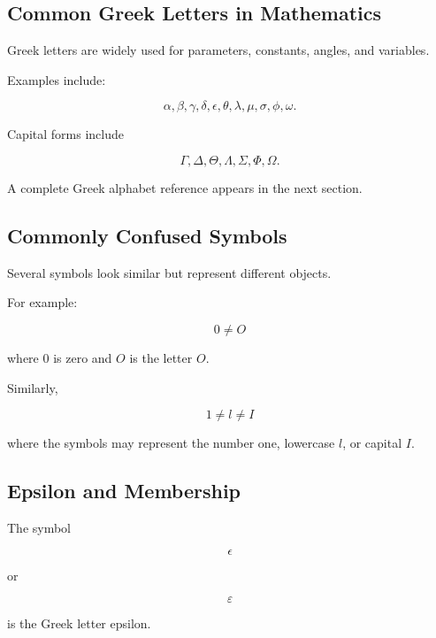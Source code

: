 \subsection{Common Greek Letters in Mathematics}
\label{subsec:greek-symbol-preview}

Greek letters are widely used for parameters, constants, angles, and
variables.

Examples include:

\[
\boxed{
\alpha,\beta,\gamma,\delta,\epsilon,\theta,\lambda,\mu,\sigma,\phi,\omega.
}
\]

Capital forms include

\[
\boxed{
\Gamma,\Delta,\Theta,\Lambda,\Sigma,\Phi,\Omega.
}
\]

A complete Greek alphabet reference appears in the next section.

\subsection{Commonly Confused Symbols}
\label{subsec:commonly-confused-symbols}

Several symbols look similar but represent different objects.

For example:

\[
\boxed{
0
\neq
O
}
\]

where \(0\) is zero and \(O\) is the letter \(O\).

Similarly,

\[
\boxed{
1
\neq
l
\neq
I
}
\]

where the symbols may represent the number one, lowercase \(l\), or capital
\(I\).

\subsection{Epsilon and Membership}
\label{subsec:epsilon-membership-confusion}

The symbol

\[
\boxed{
\epsilon
}
\]

or

\[
\boxed{
\varepsilon
}
\]

is the Greek letter epsilon.

